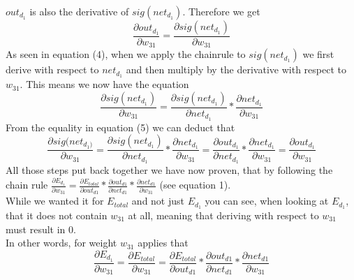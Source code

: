 \documentclass[11pt, halfparskip]{article}
\begin{document}
$out_{d_1}$ is also the derivative of $sig(net_{d_1})$. Therefore we get
    \begin{equation}
	\frac{\partial out_{d_1}}{\partial w_{31}} = \frac{\partial sig(net_{d_1})}{\partial w_{31}}
    \end{equation}
As seen in equation (4), when we apply the chainrule to $sig(net_{d_1})$ we first derive with respect to $net_{d_1}$ and then multiply by the derivative with respect to $w_{31}$.
This means we now have the equation
    \begin{equation}
	\frac{\partial sig(net_{d_1})}{\partial w_{31}} = \frac{\partial sig(net_{d_1})}{\partial net_{d_1}}*\frac{\partial net_{d_1}}{\partial w_{31}}
    \end{equation}
From the equality in equation (5) we can deduct that
    \begin{equation}
    	\frac{\partial sig(net_{d_1)}}{\partial w_{31}} = \frac{\partial sig(net_{d_1})}{\partial net_{d_1}}*\frac{\partial net_{d_1}}{\partial w_{31}} = \frac{\partial out_{d_1}}{\partial 			net_{d_1}}*\frac{\partial net_{d_1}}{\partial w_{31}} = \frac{\partial out_{d_1}}{\partial w_{31}}
    \end{equation}
All those steps put back together we have now proven, that by following the chain rule $\frac{\partial E_{d_1}}{\partial w_{31}} = \frac{\partial E_{total}}{\partial out_{d1}} * \frac{\partial out_{d1}}{\partial net_{d1}} * \frac{\partial net_{d1}}{\partial w_{31}}$ (see equation 1).\\
While we wanted it for $E_{total}$ and not just $E_{d_1}$ you can see, when looking at $E_{d_1}$, that it does not contain $w_{31}$ at all, meaning that deriving with respect to $w_{31}$ must result in 0. \\
In other words, for weight $w_{31}$ applies that
    \begin{equation}
    	\frac{\partial E_{d_1}}{\partial w_{31}} = \frac{\partial E_{total}}{\partial w_{31}} = \frac{\partial E_{total}}{\partial out_{d1}} * \frac{\partial out_{d1}}{\partial net_{d1}} * 			\frac{\partial net_{d1}}{\partial w_{31}}
    \end{equation}
\end{document}
